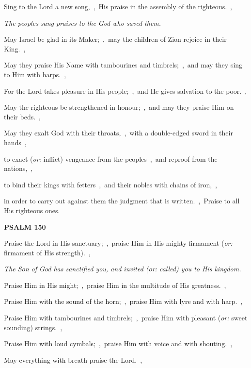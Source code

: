 \documentclass[12pt,twoside,a5paper]{article}
\newcommand{\psalm}[1]{\textbf{PSALM {#1}}\nopagebreak}
\newcommand{\qanona}[1]{{\liturgicalhint{Qanona.} \emph{#1}}}
\newcommand{\translationoption}[1]{\emph{or:} #1}
\begin{document}
\begin{normalparskip}
  Sing to the Lord a new song,~\sep\ His praise in the assembly of the righteous.~\sep

  \qanona{The peoples sang praises to the God who saved them.}

  May Israel be glad in its Maker;~\sep\ may the children of Zion rejoice in their King.~\sep

  May they praise His Name with tambourines and timbrels;~\sep\ and may they sing to Him with harps.~\sep

  For the Lord takes pleasure in His people;~\sep\ and He gives salvation to the poor.~\sep

  May the righteous be strengthened in honour;~\sep\ and may they praise Him on their beds.~\sep

  May they exalt God with their throats,~\sep\ with a double-edged sword in their hands~\sep

  to exact (\translationoption{inflict}) vengeance from the peoples~\sep\ and reproof from the nations,~\sep

  to bind their kings with fetters~\sep\ and their nobles with chains of iron,~\sep

  in order to carry out against them the judgment that is written.~\sep\ Praise to all His righteous ones.
\end{normalparskip}

\psalm{150}

\begin{normalparskip}
  Praise the Lord in His sanctuary;~\sep\ praise Him in His mighty firmament (\translationoption{firmament of His strength}).~\sep

  \qanona{The Son of God has sanctified you, and invited (\translationoption{called}) you to His kingdom.}

  Praise Him in His might;~\sep\ praise Him in the multitude of His greatness.~\sep

  Praise Him with the sound of the horn;~\sep\ praise Him with lyre and with harp.~\sep

  Praise Him with tambourines and timbrels;~\sep\ praise Him with pleasant (\translationoption{sweet sounding}) strings.~\sep

  Praise Him with loud cymbals;~\sep\ praise Him with voice and with shouting.~\sep

  May everything with breath praise the Lord.~\sep
\end{normalparskip}

\end{document}
